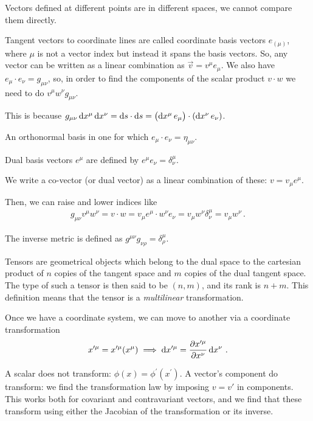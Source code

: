 \documentclass[main.tex]{subfiles}
\begin{document}
Vectors defined at different points are in different spaces, we cannot compare them directly. 

Tangent vectors to coordinate lines are called coordinate basis vectors \(e_{(\mu )}\), where \(\mu \) is not a vector index but instead it spans the basis vectors. So, any vector can be written as a linear combination as \(\vec{v} = v^{\mu } e_{\mu }\).
We also have \(e_{\mu } \cdot e_{\nu } = g_{\mu \nu }\), so, in order to find the components of the scalar product \(v \cdot w\) we need to do \(v^{\mu } w^{\nu } g_{\mu \nu  }\). 

This is because \(g_{\mu \nu } \dd{x^{\mu } } \dd{x^{\nu }} = \dd{s} \cdot \dd{s} = \qty(\dd{x^{\mu }} e_{\mu }) \cdot \qty(\dd{x^{\nu }} e_{\nu })\). 

An orthonormal basis in one for which \(e_{\mu } \cdot e_{\nu } = \eta_{\mu \nu }\). 

Dual basis vectors \(e^{\mu }\) are defined by \(e^{\mu } e_{\nu } = \delta^{\mu }_{\nu }\). 

We write a co-vector (or dual vector) as a linear combination of these: \(v = v_{\mu } e^{\mu }\). 

Then, we can raise and lower indices like 
%
\begin{align}
g_{\mu \nu } v^{\mu } w^{\nu } = v \cdot w = v_{\mu } e^{\mu } \cdot w^{\nu } e_{\nu } = v_{\mu } w^{\nu } \delta^{\mu }_{\nu } = v_{\mu } w^{\nu }
\,.
\end{align}

The inverse metric is defined as \(g^{\mu \nu } g_{\nu \rho } = \delta^{\mu }_{\rho }\). 

Tensors are geometrical objects which belong to the dual space to the cartesian product of \(n\) copies of the tangent space and \(m\) copies of the dual tangent space. 
The type of such a tensor is then said to be  \((n, m)\), and its rank is \(n+m\). 
This definition means that the tensor is a \emph{multilinear} transformation. 

Once we have a coordinate system, we can move to another via a coordinate transformation 
%
\begin{align}
x^{\prime \mu } = x^{\prime \mu } \qty(x^{\mu })
\implies 
\dd{x^{\prime \mu }} = \pdv{x^{\prime \mu }}{x^{\nu }} \dd{x^{\nu }}
\,.
\end{align}

A scalar does not transform: \(\phi (x) = \phi^{\prime } (x^{\prime })\).
A vector's component do transform: we find the transformation law by imposing \(v = v'\) in components. 
This works both for covariant and contravariant vectors, and we find that these transform using either the Jacobian of the transformation or its inverse. 
\end{document}
